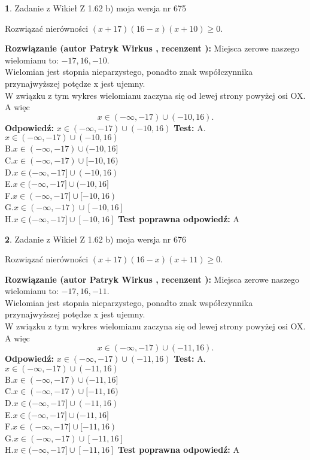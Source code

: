 \documentclass[12pt, a4paper]{article}
\theoremstyle{definition} %
\newtheorem{zad}{}
\newcommand{\zadStart}[1]{\begin{zad}#1\newline}
\newcommand{\zadStop}{\end{zad}}
\newcommand{\rozwStart}[2]{\noindent \textbf{Rozwiązanie (autor #1 , recenzent #2): }\newline}
\newcommand{\rozwStop}{\newline}
\newcommand{\odpStart}{\noindent \textbf{Odpowiedź:}\newline}
\newcommand{\odpStop}{\newline}
\newcommand{\testStart}{\noindent \textbf{Test:}\newline}
\newcommand{\testStop}{\newline}
\newcommand{\kluczStart}{\noindent \textbf{Test poprawna odpowiedź:}\newline}
\newcommand{\kluczStop}{\newline}
\begin{document}
\zadStart{Zadanie z Wikieł Z 1.62 b) moja wersja nr 675}

Rozwiązać nierówności $(x+17)(16-x)(x+10)\ge0$.
\zadStop
\rozwStart{Patryk Wirkus}{}
Miejsca zerowe naszego wielomianu to: $-17, 16, -10$.\\
Wielomian jest stopnia nieparzystego, ponadto znak współczynnika przy\linebreak najwyższej potędze x jest ujemny.\\ W związku z tym wykres wielomianu zaczyna się od lewej strony powyżej osi OX. A więc $$x \in (-\infty,-17) \cup (-10,16).$$
\rozwStop
\odpStart
$x \in (-\infty,-17) \cup (-10,16)$
\odpStop
\testStart
A.$x \in (-\infty,-17) \cup (-10,16)$\\
B.$x \in (-\infty,-17) \cup (-10,16]$\\
C.$x \in (-\infty,-17) \cup [-10,16)$\\
D.$x \in (-\infty,-17] \cup (-10,16)$\\
E.$x \in (-\infty,-17] \cup (-10,16]$\\
F.$x \in (-\infty,-17] \cup [-10,16)$\\
G.$x \in (-\infty,-17) \cup [-10,16]$\\
H.$x \in (-\infty,-17] \cup [-10,16]$
\testStop
\kluczStart
A
\kluczStop



\zadStart{Zadanie z Wikieł Z 1.62 b) moja wersja nr 676}

Rozwiązać nierówności $(x+17)(16-x)(x+11)\ge0$.
\zadStop
\rozwStart{Patryk Wirkus}{}
Miejsca zerowe naszego wielomianu to: $-17, 16, -11$.\\
Wielomian jest stopnia nieparzystego, ponadto znak współczynnika przy\linebreak najwyższej potędze x jest ujemny.\\ W związku z tym wykres wielomianu zaczyna się od lewej strony powyżej osi OX. A więc $$x \in (-\infty,-17) \cup (-11,16).$$
\rozwStop
\odpStart
$x \in (-\infty,-17) \cup (-11,16)$
\odpStop
\testStart
A.$x \in (-\infty,-17) \cup (-11,16)$\\
B.$x \in (-\infty,-17) \cup (-11,16]$\\
C.$x \in (-\infty,-17) \cup [-11,16)$\\
D.$x \in (-\infty,-17] \cup (-11,16)$\\
E.$x \in (-\infty,-17] \cup (-11,16]$\\
F.$x \in (-\infty,-17] \cup [-11,16)$\\
G.$x \in (-\infty,-17) \cup [-11,16]$\\
H.$x \in (-\infty,-17] \cup [-11,16]$
\testStop
\kluczStart
A
\kluczStop
\end{document}
